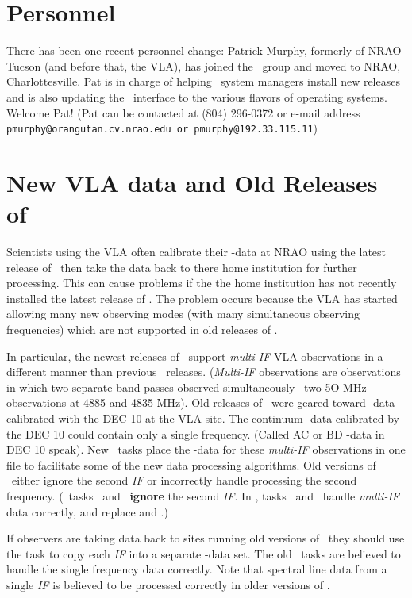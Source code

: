 \section{Personnel}
There has been one recent personnel change: Patrick Murphy, formerly of NRAO
Tucson (and before that, the VLA),
has joined the \AIPS\ group and moved to NRAO, Charlottesville.  Pat is
in charge of helping \AIPS\  system managers install new releases and is also
updating the \AIPS\  interface to the various flavors of operating systems.
Welcome Pat!  (Pat can be contacted at (804) 296-0372 or e-mail address
{\tt pmurphy@orangutan.cv.nrao.edu or pmurphy@192.33.115.11})

\section{New VLA data and Old Releases of \AIPS}

Scientists using the VLA often calibrate their \UV-data at NRAO using the
latest release of \AIPS\, then take the data back to there home institution for
further processing.  This can cause problems if the the home institution has
not recently installed the latest release of \AIPS.  The problem occurs because
the VLA has started allowing many new observing modes (with many simultaneous
observing frequencies) which are not supported in old releases of \AIPS.

In particular, the newest releases of \AIPS\ support
{\it multi-IF} VLA observations in a different manner than
previous \AIPS\ releases.
({\it Multi-IF} observations are observations in which two separate band
passes observed simultaneously \eg\ two 5O MHz observations at
4885 and 4835 MHz).
Old releases of \AIPS\ were geared toward \UV-data calibrated with the
DEC 10 at the VLA site.
The continuum \UV-data calibrated by the DEC 10 could contain only a single
frequency.  (Called AC or BD \UV-data in DEC 10 speak).
New \AIPS\ tasks place the \UV-data for these {\it multi-IF}
observations in one file to facilitate some of the new data processing
algorithms.
Old versions of \AIPS\ either ignore the second {\it IF} or incorrectly
handle processing the second frequency.
(\AIPS\ tasks \UVMAP\ and \ASCAL\ {\bf ignore} the
second {\it IF}.
In \JANNO, tasks \MX\ and \CALIB\
handle {\it multi-IF} data correctly, and
replace \UVMAP and \ASCAL.)

If observers are taking data back to sites running old versions of \AIPS\
they should use the task \UVCOP to copy each {\it IF} into a
separate \UV-data set.
The old \AIPS\ tasks are believed to handle the single frequency
data correctly.
Note that spectral line data from a single {\it IF} is believed
to be processed correctly in older versions of \AIPS.

